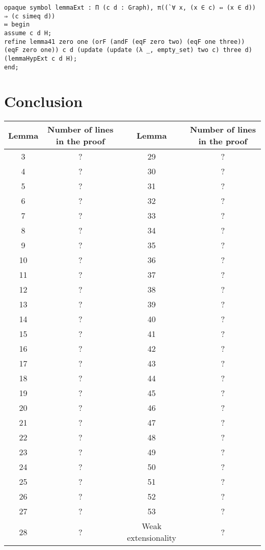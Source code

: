 \documentclass[a4paper]{article}
\begin{document}
\begin{lstlisting}
opaque symbol lemmaExt : Π (c d : Graph), π((`∀ x, (x ∈ c) ⇔ (x ∈ d)) ⇒ (c simeq d))
≔ begin
assume c d H;
refine lemma41 zero one (orF (andF (eqF zero two) (eqF one three)) (eqF zero one)) c d (update (update (λ _, empty_set) two c) three d) (lemmaHypExt c d H);
end;
\end{lstlisting}

\section{Conclusion}

\begin{center}
\begin{tabular}{|c|c||c|c|}
\hline Lemma & Number of lines in the proof & Lemma & Number of lines in the proof \\
\hline 3 & ? & 29 & ? \\
\hline 4 & ? & 30 & ? \\
\hline 5 & ? & 31 & ? \\
\hline 6 & ? & 32 & ? \\
\hline 7 & ? & 33 & ? \\
\hline 8 & ? & 34 & ? \\
\hline 9 & ? & 35 & ? \\
\hline 10 & ? & 36 & ? \\
\hline 11 & ? & 37 & ? \\
\hline 12 & ? & 38 & ? \\
\hline 13 & ? & 39 & ? \\
\hline 14 & ? & 40 & ? \\
\hline 15 & ? & 41 & ? \\
\hline 16 & ? & 42 & ? \\
\hline 17 & ? & 43 & ? \\
\hline 18 & ? & 44 & ? \\
\hline 19 & ? & 45 & ? \\
\hline 20 & ? & 46 & ? \\
\hline 21 & ? & 47 & ? \\
\hline 22 & ? & 48 & ? \\
\hline 23 & ? & 49 & ? \\
\hline 24 & ? & 50 & ? \\
\hline 25 & ? & 51 & ? \\
\hline 26 & ? & 52 & ? \\
\hline 27 & ? & 53 & ? \\
\hline 28 & ? & Weak extensionality & ? \\
\hline
\end{tabular}
\end{center}

\printbibliography
\end{document}

